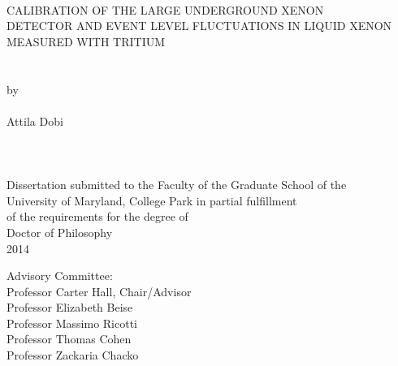 
\thispagestyle{empty}
\hbox{\ }
\vspace{1in}
\renewcommand{\baselinestretch}{1}
\small\normalsize
\begin{center}

\large{{CALIBRATION OF THE LARGE UNDERGROUND XENON\\
DETECTOR AND EVENT LEVEL FLUCTUATIONS IN LIQUID XENON MEASURED WITH TRITIUM}}\\
\ \\
\ \\
\large{by} \\
\ \\
\large{Attila Dobi}%
\ \\
\ \\
\ \\
\ \\
\normalsize
Dissertation submitted to the Faculty of the Graduate School of the \\
University of Maryland, College Park in partial fulfillment \\
of the requirements for the degree of \\
Doctor of Philosophy \\
2014
\end{center}

\vspace{7.5em}

\noindent Advisory Committee: \\
Professor Carter Hall, Chair/Advisor \\
Professor Elizabeth Beise \\
Professor Massimo Ricotti \\
Professor Thomas Cohen \\
Professor Zackaria Chacko
